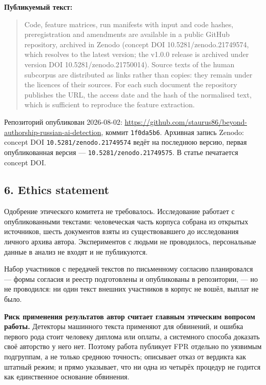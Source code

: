 \documentclass[11pt,a4paper]{article}
\renewcommand{\_}{\textunderscore\allowbreak}
\begin{document}
\textbf{Публикуемый текст:}

\begin{quote}
Code, feature matrices, run manifests with input and code hashes, preregistration
and amendments are available in a public GitHub repository, archived in Zenodo
(concept DOI 10.5281/zenodo.21749574, which resolves to the latest version;
the v1.0.0 release is archived under version DOI 10.5281/zenodo.21750014).
Source texts of the
human subcorpus are distributed as links rather than copies: they remain under the
licences of their sources. For each such document the repository publishes the
URL, the access date and the hash of the normalised text, which is sufficient to
reproduce the feature extraction.
\end{quote}

Репозиторий опубликован 2026-08-02:
\url{https://github.com/staurus86/beyond-authorship-russian-ai-detection}, коммит
\texttt{1f0da5b6}. Архивная запись Zenodo: concept DOI \texttt{10.5281/zenodo.21749574} ведёт на последнюю версию,
первая опубликованная версия — \texttt{10.5281/zenodo.21749575}. В статье печатается concept DOI.

\subsection{6. Ethics statement}

Одобрение этического комитета не требовалось. Исследование работает с
опубликованными текстами: человеческая часть корпуса собрана из открытых
источников, шесть документов взяты из существовавшего до исследования личного
архива автора. Экспериментов с людьми не проводилось, персональные данные в
анализ не входят и не публикуются.

Набор участников с передачей текстов по письменному согласию планировался —
формы согласия и реестр подготовлены и опубликованы в репозитории, — но не
проводился: ни один текст внешних участников в корпус не вошёл, выплат не было.

\textbf{Риск применения результатов автор считает главным этическим вопросом работы.}
Детекторы машинного текста применяют для обвинений, и ошибка первого рода стоит
человеку диплома или оплаты, а системного способа доказать своё авторство у него
нет. Поэтому работа публикует FPR отдельно по уязвимым подгруппам, а не только
среднюю точность; описывает отказ от вердикта как штатный режим; и прямо указывает,
что ни одна из четырёх процедур не годится как единственное основание обвинения.
\end{document}
